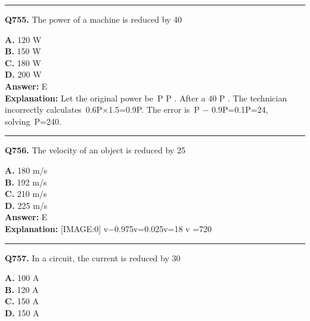 \documentclass[12pt]{article}
\begin{document}
\hrule
\vspace{1em}


\noindent
\textbf{Q755.} The power of a machine is reduced by 40%



\textbf{A.} 120 W \\
\textbf{B.} 150 W \\
\textbf{C.} 180 W \\
\textbf{D.} 200 W \\

\textbf{Answer:} E \\
\textbf{Explanation:} Let the original power be P
P
. After a 40%
P
. The technician incorrectly calculates 0.6P×1.5=0.9P. The error is P
−
0.9P=0.1P=24, solving P=240.

\hrule
\vspace{1em}


\noindent
\textbf{Q756.} The velocity of an object is reduced by 25%



\textbf{A.} 180 m/s \\
\textbf{B.} 192 m/s \\
\textbf{C.} 210 m/s \\
\textbf{D.} 225 m/s \\

\textbf{Answer:} E \\
\textbf{Explanation:} [IMAGE:0]
v−0.975v=0.025v=18
v
=720

\hrule
\vspace{1em}


\noindent
\textbf{Q757.} In a circuit, the current is reduced by 30%



\textbf{A.} 100 A \\
\textbf{B.} 120 A \\
\textbf{C.} 150 A \\
\textbf{D.} 150 A \\
\end{document}

